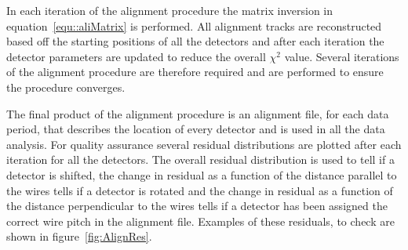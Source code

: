 In each iteration of the alignment procedure the matrix inversion in
equation~\ref{equ::aliMatrix} is performed.  All alignment tracks are
reconstructed based off the starting positions of all the detectors
and after each iteration the detector parameters are updated to reduce
the overall $\chi^2$ value.  Several iterations of the alignment
procedure are therefore required and are performed to ensure the
procedure converges.\par

The final product of the alignment procedure is an alignment file, for
each data period, that describes the location of every detector and is
used in all the data analysis.  For quality assurance several residual
distributions are plotted after each iteration for all the detectors.
The overall residual distribution is used to tell if a detector is
shifted, the change in residual as a function of the distance parallel
to the wires tells if a detector is rotated and the change in residual
as a function of the distance perpendicular to the wires tells if a
detector has been assigned the correct wire pitch in the alignment
file.  Examples of these residuals, to check are shown in
figure~\ref{fig:AlignRes}.


